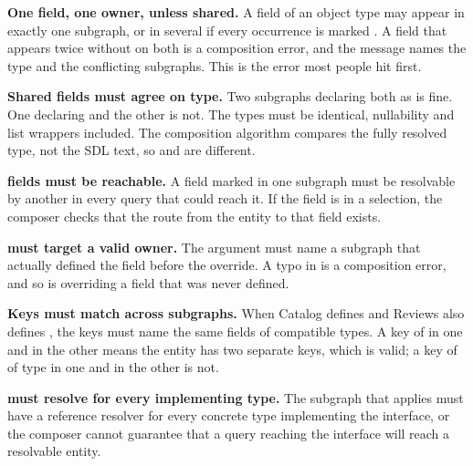 %
\medskip\noindent\textbf{One field, one owner, unless shared.} A field of an
object type may appear in exactly one subgraph, or in several if every
occurrence is marked . A field that appears twice without
 on both is a composition error, and the message names the type
and the conflicting subgraphs. This is the error most people hit first.

%
\medskip\noindent\textbf{Shared fields must agree on type.} Two subgraphs
declaring  both as  is fine. One declaring
 and the other  is not. The types must be identical,
nullability and list wrappers included. The composition algorithm compares the
fully resolved type, not the SDL text, so \code{[String]!} and
\code{[String!]!} are different.

%
\medskip\noindent\textbf{ fields must be reachable.} A field
marked  in one subgraph must be resolvable by another in every
query that could reach it. If the field is in a  selection, the
composer checks that the route from the entity to that field exists.

%
\medskip\noindent\textbf{ must target a valid owner.} The
 argument must name a subgraph that actually defined the field before
the override. A typo in  is a composition error, and so is overriding
a field that was never defined.

%
\medskip\noindent\textbf{Keys must match across subgraphs.} When Catalog defines
 and Reviews also defines
, the keys must name the same fields of
compatible types. A key of  in one and 
in the other means the entity has two separate keys, which is valid; a key of
 of type  in one and  in the other is
not.

%
\medskip\noindent\textbf{ must resolve for every
implementing type.} The subgraph that applies  must have
a reference resolver for every concrete type implementing the interface, or the
composer cannot guarantee that a query reaching the interface will reach a
resolvable entity.

